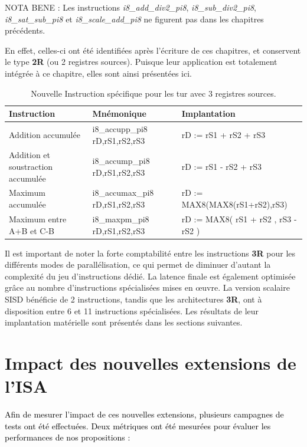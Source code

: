 \documentclass[../main.tex]{subfiles}
\begin{document}
NOTA BENE : Les instructions \textit{i8\_add\_div2\_pi8}, \textit{i8\_sub\_div2\_pi8}, \textit{i8\_sat\_sub\_pi8} et \textit{i8\_scale\_add\_pi8} ne figurent pas dans les chapitres précédents.

En effet, celles-ci ont été identifiées après l'écriture de ces chapitres, et conservent le type \textbf{2R} (ou 2 registres sources).
Puisque leur application est totalement intégrée à ce chapitre, elles sont ainsi présentées ici.
\begin{table}[tb]
    \centering
    \footnotesize
      \begin{tabular}{l || l l }
      \hline
        \textbf{Instruction} & \textbf{Mnémonique}    & \textbf{Implantation} \\ 
        \hline   
        Addition accumulée                  & i8\_accupp\_pi8 rD,rS1,rS2,rS3    & rD := rS1 + rS2 + rS3                \\
        Addition et soustraction accumulée  & i8\_accump\_pi8 rD,rS1,rS2,rS3    & rD := rS1 - rS2 + rS3                \\
        Maximum accumulée                   & i8\_accumax\_pi8 rD,rS1,rS2,rS3   & rD := MAX8(MAX8(rS1+rS2),rS3)      \\
        Maximum entre A+B et C-B            & i8\_maxpm\_pi8 rD,rS1,rS2,rS3     & rD := MAX8( rS1 + rS2 , rS3 - rS2 ) \\
        \hline
      \end{tabular}
    \caption{Nouvelle Instruction spécifique pour les \acrlong{tur} avec 3 registres sources.}
    \label{tab:instrus_turbo_3reg}
    \end{table}
Il est important de noter la forte comptabilité entre les instructions \textbf{3R} pour les différents modes de parallélisation, ce qui permet de diminuer d'autant la complexité du jeu d'instructions dédié.
La latence finale est également optimisée grâce au nombre d'instructions spécialisées mises en œuvre.
La version scalaire SISD bénéficie de 2 instructions, tandis que les architectures \textbf{3R}, ont à disposition entre 6 et 11 instructions spécialisées.
Les résultats de leur implantation matérielle sont présentés dans les sections suivantes.
%
%
%
% 
%
\section{Impact des nouvelles extensions de l'ISA}
%
%
%
%
%
\textcolor{black}{Afin de mesurer l'impact de ces nouvelles extensions, plusieurs campagnes de tests ont été effectuées. 
Deux métriques ont été mesurées pour évaluer les performances de nos propositions :}
\end{document}
